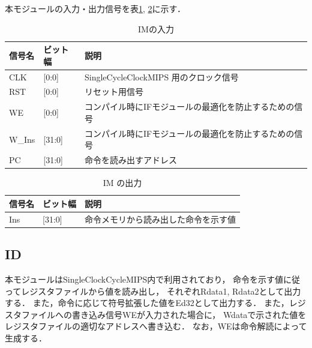本モジュールの入力・出力信号を表\ref{tab:im_input}, \ref{tab:im_output}に示す．
\begin{table}[h]
  \caption{IMの入力}
  \centering
  \begin{tabular}{l|l|l}
    信号名 & ビット幅 & 説明 \\
    \hline
    CLK & [0:0] & SingleCycleClockMIPS 用のクロック信号 \\
    RST & [0:0] & リセット用信号 \\
    WE & [0:0] & コンパイル時にIFモジュールの最適化を防止するための信号 \\
    W\_Ins & [31:0] & コンパイル時にIFモジュールの最適化を防止するための信号 \\
    PC & [31:0] & 命令を読み出すアドレス \\
  \end{tabular}
  \label{tab:im_input}
\end{table}
\begin{table}[h]
  \caption{IM の出力}
  \centering
  \begin{tabular}{l|l|l}
    信号名 & ビット幅 & 説明 \\
    \hline
    Ins & [31:0] & 命令メモリから読み出した命令を示す値 \\
  \end{tabular}
  \label{tab:im_output}
\end{table}


\subsection{ID}
本モジュールはSingleClockCycleMIPS内で利用されており，
命令を示す値に従ってレジスタファイルから値を読み出し，
それぞれRdata1, Rdata2として出力する．
また，命令に応じて符号拡張した値をEd32として出力する．
また，レジスタファイルへの書き込み信号WEが入力された場合に，
Wdataで示された値をレジスタファイルの適切なアドレスへ書き込む．
なお，WEは命令解読によって生成する．

